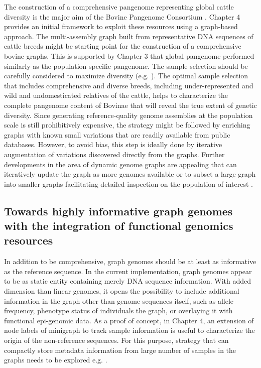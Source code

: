 \documentclass[../main.tex]{subfiles}
\begin{document}
The construction of a comprehensive pangenome representing  global cattle diversity is the major aim of the Bovine Pangenome Consortium \citep{heaton2021reference}. Chapter 4 provides an initial framework to exploit these resources using a graph-based approach. The multi-assembly graph built from representative DNA sequences of cattle breeds might be starting point for the construction of a comprehensive bovine graphs. This is supported by Chapter 3 that global pangenome performed similarly as the population-specific pangenome. The sample selection should be carefully considered to maximize diversity (e.g. \citep{Ros-Freixedes2017,ranallo2021optimized}). The optimal sample selection that includes comprehensive and diverse breeds, including under-represented and wild and undomesticated relatives of the cattle, helps to characterize the complete pangenome content of Bovinae that will reveal the true extent of genetic diversity. Since generating reference-quality genome assemblies at the population scale is still prohibitively expensive, the strategy might be followed by enriching graphs with known small variations that are readily available from public databases. However, to avoid bias, this step is ideally done by iterative augmentation of variations discovered directly from the graphs. Further developments in the area of dynamic genome graphs are appealing that can iteratively update the graph as more genomes available or to subset a large graph into smaller graphs facilitating detailed inspection on the population of interest \citep{eizenga2020efficient}.

\subsection*{Towards highly informative graph genomes with the integration of functional genomics resources}

In addition to be comprehensive, graph genomes should be at least as informative as the reference sequence. In the current implementation, graph genomes appear to be as static entity containing merely DNA sequence information. With added dimension than linear genomes, it opens the possibility to include additional information in the graph other than genome sequences itself, such as allele frequency, phenotype status of individuals the graph, or overlaying it with functional epi-genomic data. As a proof of concept, in Chapter 4, an extension of node labels of minigraph to track sample information is useful to characterize the origin of the non-reference sequences. For this purpose, strategy that can compactly store metadata information from large number of samples in the graphs needs to be explored e.g. \citet{siren2020haplotype}. 
\end{document}
